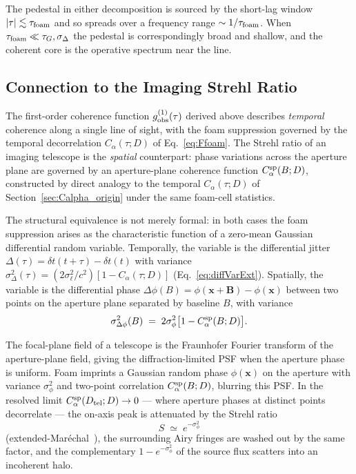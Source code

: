 \documentclass[aps,prd,onecolumn,amsmath,amssymb]{revtex4-2}
\begin{document}
The pedestal in either decomposition is sourced by the short-lag
window $|\tau|\lesssim\tau_{\rm foam}$ and so spreads over a frequency
range $\sim 1/\tau_{\rm foam}$.  When $\tau_{\rm foam}\ll
\tau_G,\sigma_\Delta$ the pedestal is correspondingly broad and
shallow, and the coherent core is the operative spectrum near the line.


\subsection{Connection to the Imaging Strehl Ratio}
\label{sec:connection}

The first-order coherence function $g^{(1)}_{\rm obs}(\tau)$ derived
above describes \emph{temporal} coherence along a single line of
sight, with the foam suppression governed by the temporal
decorrelation $C_\alpha(\tau;D)$ of Eq.~\eqref{eq:Ffoam}.  The Strehl
ratio of an imaging telescope is the \emph{spatial} counterpart:
phase variations across the aperture plane are governed by an
aperture-plane coherence function $C_\alpha^{\rm sp}(B;D)$, constructed
by direct analogy to the temporal $C_\alpha(\tau;D)$ of
Section~\ref{sec:Calpha_origin} under the same foam-cell statistics.

The structural equivalence is not merely formal: in both cases the
foam suppression arises as the characteristic function of a zero-mean
Gaussian differential random variable.  Temporally, the variable is
the differential jitter $\Delta(\tau)=\delta t(t+\tau)-\delta t(t)$
with variance $\sigma_\Delta^2(\tau)=(2\sigma_\ell^2/c^2)[1-C_\alpha(\tau;D)]$
(Eq.~\eqref{eq:diffVarExt}).  Spatially, the variable is the
differential phase
$\Delta\phi(B)=\phi(\mathbf{x}+\mathbf{B})-\phi(\mathbf{x})$
between two points on the aperture plane separated by baseline $B$,
with variance
\begin{equation}
  \sigma_{\Delta\phi}^2(B) \;=\; 2\sigma_\phi^2\bigl[1-C_\alpha^{\rm sp}(B;D)\bigr].
  \label{eq:dphi-variance}
\end{equation}

The focal-plane field of a telescope is the Fraunhofer Fourier
transform of the aperture-plane field, giving the diffraction-limited
PSF when the aperture phase is uniform.  Foam imprints a Gaussian
random phase $\phi(\mathbf{x})$ on the aperture with variance
$\sigma_\phi^2$ and two-point correlation $C_\alpha^{\rm sp}(B;D)$,
blurring this PSF.  In the resolved limit
$C_\alpha^{\rm sp}(D_{\rm tel};D)\to 0$ --- where aperture phases at
distinct points decorrelate --- the on-axis peak is attenuated by the
Strehl ratio
\begin{equation}
  S \;\simeq\; e^{-\sigma_\phi^2}
  \label{eq:strehl}
\end{equation}
(extended-Mar\'echal~\cite{NgPerlman2022}), the surrounding Airy
fringes are washed out by the same factor, and the complementary
$1-e^{-\sigma_\phi^2}$ of the source flux scatters into an incoherent
halo.
\end{document}
